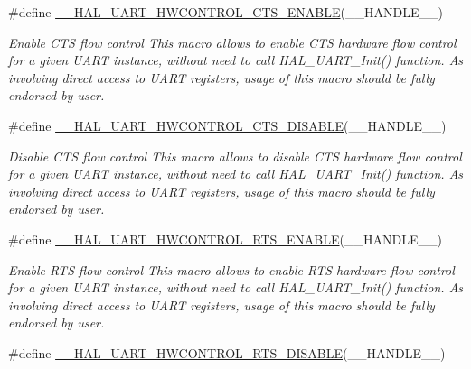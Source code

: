 \begin{DoxyCompactItemize}
\item 
\#define \hyperlink{group___u_a_r_t___exported___macros_ga4a77213945844bca4c22ba6a14b7ee4c}{\-\_\-\-\_\-\-H\-A\-L\-\_\-\-U\-A\-R\-T\-\_\-\-H\-W\-C\-O\-N\-T\-R\-O\-L\-\_\-\-C\-T\-S\-\_\-\-E\-N\-A\-B\-L\-E}(\-\_\-\-\_\-\-H\-A\-N\-D\-L\-E\-\_\-\-\_\-)
\begin{DoxyCompactList}\small\item\em Enable C\-T\-S flow control This macro allows to enable C\-T\-S hardware flow control for a given U\-A\-R\-T instance, without need to call H\-A\-L\-\_\-\-U\-A\-R\-T\-\_\-\-Init() function. As involving direct access to U\-A\-R\-T registers, usage of this macro should be fully endorsed by user. \end{DoxyCompactList}\item 
\#define \hyperlink{group___u_a_r_t___exported___macros_ga0a26cb3a576c2700f76a7c697c86a499}{\-\_\-\-\_\-\-H\-A\-L\-\_\-\-U\-A\-R\-T\-\_\-\-H\-W\-C\-O\-N\-T\-R\-O\-L\-\_\-\-C\-T\-S\-\_\-\-D\-I\-S\-A\-B\-L\-E}(\-\_\-\-\_\-\-H\-A\-N\-D\-L\-E\-\_\-\-\_\-)
\begin{DoxyCompactList}\small\item\em Disable C\-T\-S flow control This macro allows to disable C\-T\-S hardware flow control for a given U\-A\-R\-T instance, without need to call H\-A\-L\-\_\-\-U\-A\-R\-T\-\_\-\-Init() function. As involving direct access to U\-A\-R\-T registers, usage of this macro should be fully endorsed by user. \end{DoxyCompactList}\item 
\#define \hyperlink{group___u_a_r_t___exported___macros_ga017ec9001ff33136f87cc4034b2709a6}{\-\_\-\-\_\-\-H\-A\-L\-\_\-\-U\-A\-R\-T\-\_\-\-H\-W\-C\-O\-N\-T\-R\-O\-L\-\_\-\-R\-T\-S\-\_\-\-E\-N\-A\-B\-L\-E}(\-\_\-\-\_\-\-H\-A\-N\-D\-L\-E\-\_\-\-\_\-)
\begin{DoxyCompactList}\small\item\em Enable R\-T\-S flow control This macro allows to enable R\-T\-S hardware flow control for a given U\-A\-R\-T instance, without need to call H\-A\-L\-\_\-\-U\-A\-R\-T\-\_\-\-Init() function. As involving direct access to U\-A\-R\-T registers, usage of this macro should be fully endorsed by user. \end{DoxyCompactList}\item 
\#define \hyperlink{group___u_a_r_t___exported___macros_ga8c034e96ad8f263cafeb5898ff7311fd}{\-\_\-\-\_\-\-H\-A\-L\-\_\-\-U\-A\-R\-T\-\_\-\-H\-W\-C\-O\-N\-T\-R\-O\-L\-\_\-\-R\-T\-S\-\_\-\-D\-I\-S\-A\-B\-L\-E}(\-\_\-\-\_\-\-H\-A\-N\-D\-L\-E\-\_\-\-\_\-)

\end{DoxyCompactItemize}
